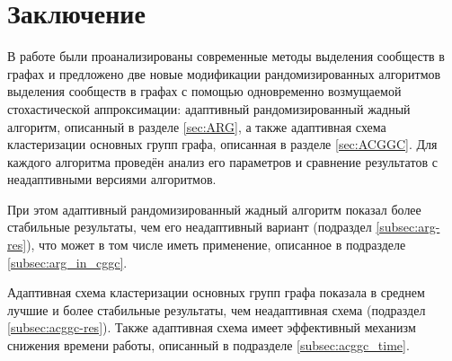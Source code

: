 
\section*{Заключение}

В работе были проанализированы современные методы выделения сообществ в графах и предложено две новые модификации рандомизированных алгоритмов выделения сообществ в графах с помощью одновременно возмущаемой стохастической аппроксимации: адаптивный рандомизированный жадный алгоритм, описанный в разделе \ref{sec:ARG}, а также адаптивная схема кластеризации основных групп графа, описанная в разделе \ref{sec:ACGGC}. Для каждого алгоритма проведён анализ его параметров и сравнение результатов с неадаптивными версиями алгоритмов.

При этом адаптивный рандомизированный жадный алгоритм показал более стабильные результаты, чем его неадаптивный вариант (подраздел \ref{subsec:arg-res}), что может в том числе иметь применение, описанное в подразделе \ref{subsec:arg_in_cggc}.

Адаптивная схема кластеризации основных групп графа показала в среднем лучшие и более стабильные результаты, чем неадаптивная схема (подраздел \ref{subsec:acggc-res}). Также адаптивная схема имеет эффективный механизм снижения времени работы, описанный в подразделе \ref{subsec:acggc_time}.